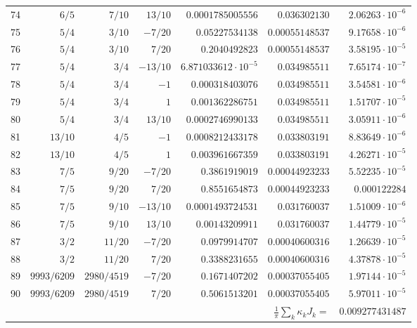 \documentclass[11pt,reqno]{amsart}
\numberwithin{equation}{section}
\theoremstyle{definition}
\theoremstyle{remark}
\begin{document}
\begin{center}
\begin{longtable}{@{}rrrrrrr@{}}
74 & $6/5$ & $7/10$ & $13/10$ & $0.0001785005556$ & $0.036302130$ & $2.06263\cdot10^{-6}$\\
75 & $5/4$ & $3/10$ & $-7/20$ & $0.05227534138$ & $0.00055148537$ & $9.17658\cdot10^{-6}$\\
76 & $5/4$ & $3/10$ & $7/20$ & $0.2040492823$ & $0.00055148537$ & $3.58195\cdot10^{-5}$\\
77 & $5/4$ & $3/4$ & $-13/10$ & $6.871033612\cdot10^{-5}$ & $0.034985511$ & $7.65174\cdot10^{-7}$\\
78 & $5/4$ & $3/4$ & $-1$ & $0.000318403076$ & $0.034985511$ & $3.54581\cdot10^{-6}$\\
79 & $5/4$ & $3/4$ & $1$ & $0.001362286751$ & $0.034985511$ & $1.51707\cdot10^{-5}$\\
80 & $5/4$ & $3/4$ & $13/10$ & $0.0002746990133$ & $0.034985511$ & $3.05911\cdot10^{-6}$\\
81 & $13/10$ & $4/5$ & $-1$ & $0.0008212433178$ & $0.033803191$ & $8.83649\cdot10^{-6}$\\
82 & $13/10$ & $4/5$ & $1$ & $0.003961667359$ & $0.033803191$ & $4.26271\cdot10^{-5}$\\
83 & $7/5$ & $9/20$ & $-7/20$ & $0.3861919019$ & $0.00044923233$ & $5.52235\cdot10^{-5}$\\
84 & $7/5$ & $9/20$ & $7/20$ & $0.8551654873$ & $0.00044923233$ & $0.000122284$\\
85 & $7/5$ & $9/10$ & $-13/10$ & $0.0001493724531$ & $0.031760037$ & $1.51009\cdot10^{-6}$\\
86 & $7/5$ & $9/10$ & $13/10$ & $0.00143209911$ & $0.031760037$ & $1.44779\cdot10^{-5}$\\
87 & $3/2$ & $11/20$ & $-7/20$ & $0.0979914707$ & $0.00040600316$ & $1.26639\cdot10^{-5}$\\
88 & $3/2$ & $11/20$ & $7/20$ & $0.3388231655$ & $0.00040600316$ & $4.37878\cdot10^{-5}$\\
89 & $9993/6209$ & $2980/4519$ & $-7/20$ & $0.1671407202$ & $0.00037055405$ & $1.97144\cdot10^{-5}$\\
90 & $9993/6209$ & $2980/4519$ & $7/20$ & $0.5061513201$ & $0.00037055405$ & $5.97011\cdot10^{-5}$\\
\midrule \multicolumn{6}{r}{$\frac1\pi\sum_k\kappa_kJ_k=$} & $0.009277431487$\\
\end{longtable}
\end{center}
\end{document}
